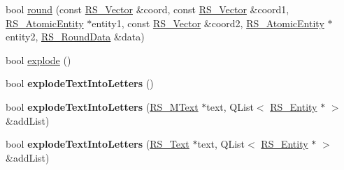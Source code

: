 \begin{DoxyCompactItemize}
\item 
bool \hyperlink{classRS__Modification_a0b2f149d7ceb46815f771f559560d655}{round} (const \hyperlink{classRS__Vector}{R\-S\-\_\-\-Vector} \&coord, const \hyperlink{classRS__Vector}{R\-S\-\_\-\-Vector} \&coord1, \hyperlink{classRS__AtomicEntity}{R\-S\-\_\-\-Atomic\-Entity} $\ast$entity1, const \hyperlink{classRS__Vector}{R\-S\-\_\-\-Vector} \&coord2, \hyperlink{classRS__AtomicEntity}{R\-S\-\_\-\-Atomic\-Entity} $\ast$entity2, \hyperlink{classRS__RoundData}{R\-S\-\_\-\-Round\-Data} \&data)
\item 
bool \hyperlink{classRS__Modification_a7e3b8a8fe808ceeaac680d29b85c3d79}{explode} ()
\item 
\hypertarget{classRS__Modification_a9588ff796bf2583f81d46ac34bc2071e}{bool {\bfseries explode\-Text\-Into\-Letters} ()}\label{classRS__Modification_a9588ff796bf2583f81d46ac34bc2071e}

\item 
\hypertarget{classRS__Modification_ac34dd8ffa95febf9210e09695cfd43b7}{bool {\bfseries explode\-Text\-Into\-Letters} (\hyperlink{classRS__MText}{R\-S\-\_\-\-M\-Text} $\ast$text, Q\-List$<$ \hyperlink{classRS__Entity}{R\-S\-\_\-\-Entity} $\ast$ $>$ \&add\-List)}\label{classRS__Modification_ac34dd8ffa95febf9210e09695cfd43b7}

\item 
\hypertarget{classRS__Modification_ad8bc75fb7be8dfd3115a733fd0851645}{bool {\bfseries explode\-Text\-Into\-Letters} (\hyperlink{classRS__Text}{R\-S\-\_\-\-Text} $\ast$text, Q\-List$<$ \hyperlink{classRS__Entity}{R\-S\-\_\-\-Entity} $\ast$ $>$ \&add\-List)}\label{classRS__Modification_ad8bc75fb7be8dfd3115a733fd0851645}


\end{DoxyCompactItemize}
